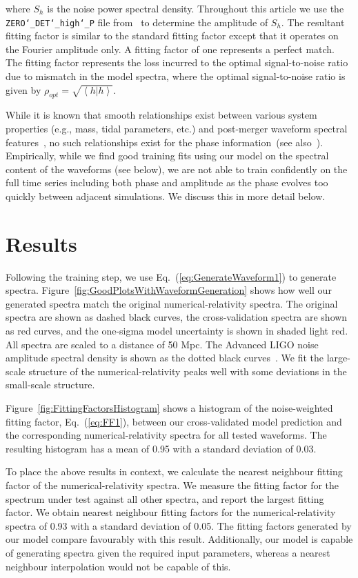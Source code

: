 \documentclass[../Thesis.tex]{subfiles}
\begin{document}
        where $S_h$ is the noise power spectral  density. Throughout this article we use the \texttt{ZERO\char`_DET\char`_high\char`_P} file from~\cite{PSD:aLIGO} to determine the amplitude of $S_h$. The resultant fitting factor is similar to the standard fitting factor except that it operates on the Fourier amplitude only. A fitting factor of one represents a perfect match. The fitting factor represents the loss incurred to the  optimal signal-to-noise ratio due to mismatch in the model spectra, where the optimal signal-to-noise ratio is given by $\rho_{opt}=\sqrt{	\left<h|h\right>}$.\par
        While it is known that smooth relationships exist between various system properties (e.g., mass, tidal parameters, etc.) and post-merger waveform spectral features~\cite{Bauswein2012,Takami2014,Bernuzzi2015,Takami2015,Bauswein2015,Rezzolla2016}, no such relationships exist for the phase information~(see also~\cite{Messenger2014}). Empirically, while we find good training fits using our model on the spectral content of the waveforms (see below), we are not able to train confidently on the full time series including both phase and amplitude as the phase evolves too quickly between adjacent simulations.  We discuss this in more detail below. \par 

    \section{Results}
        Following the training step, we use Eq.~(\ref{eq:GenerateWaveform1}) to generate spectra.  Figure~\ref{fig:GoodPlotsWithWaveformGeneration} shows how well our generated spectra match the original numerical-relativity spectra. The original spectra are shown as dashed black curves, the cross-validation spectra are shown as red curves, and the one-sigma model uncertainty is shown in shaded light red. All spectra are scaled to a distance of 50 Mpc. The Advanced LIGO noise amplitude spectral density is shown as the dotted black curves~\cite{PSD:aLIGO}.  We fit the large-scale structure of the numerical-relativity peaks well with some deviations in the small-scale structure. \par Figure~\ref{fig:FittingFactorsHistogram} shows a histogram of the noise-weighted fitting factor, Eq.~(\ref{eq:FF1}), between our cross-validated model prediction and the corresponding numerical-relativity spectra for all tested waveforms. The resulting histogram has a mean of 0.95 with a standard deviation of 0.03. \par
        To place the above results in context, we calculate the nearest neighbour fitting factor of the numerical-relativity spectra. We measure the fitting factor for the spectrum under test against all other spectra, and report the largest fitting factor. We obtain nearest neighbour fitting factors for the numerical-relativity spectra of 0.93 with a standard deviation of 0.05. The fitting factors generated by our model compare favourably with this result. Additionally, our model is capable of generating spectra given the required input parameters, whereas a nearest neighbour interpolation would not be capable of this.\par
           
\end{document}
